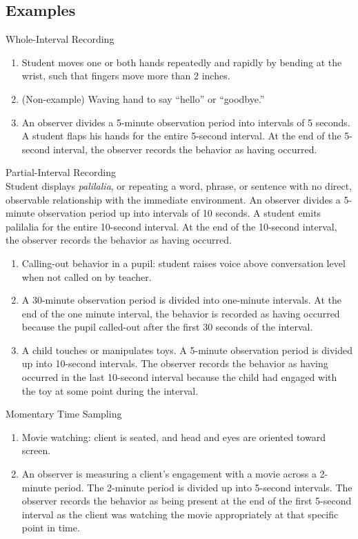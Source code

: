 \subsection{Examples}
Whole-Interval Recording
\begin{enumerate}
\item Student moves one or both hands repeatedly and rapidly by bending at the wrist, such that fingers move more than 2 inches. 
\item (Non-example) Waving hand to say ``hello'' or ``goodbye.''
\item An observer divides a 5-minute observation period into intervals of 5 seconds. A student flaps his hands for the entire 5-second interval. At the end of the 5-second interval, the observer records the behavior as having occurred.
\end{enumerate}
%
Partial-Interval Recording\\
Student displays \textit{palilalia}, or repeating a word, phrase, or sentence with no direct, observable relationship with the immediate environment. An observer divides a 5-minute observation period up into intervals of 10 seconds. A student emits palilalia for the entire 10-second interval. At the end of the 10-second interval, the observer records the behavior as having occurred.
\begin{enumerate}
\item Calling-out behavior in a pupil: student raises voice above conversation level when not called on by teacher.
\item A 30-minute observation period is divided into one-minute intervals.  At the end of the one minute interval, the behavior is recorded as having occurred because the pupil called-out after the first 30 seconds of the interval.
\item A child touches or manipulates toys. A 5-minute observation period is divided up into 10-second intervals. The observer records the behavior as having occurred in the last 10-second interval because the child had engaged with the toy at some point during the interval. 
\end{enumerate}

Momentary Time Sampling\\
\begin{enumerate}
\item Movie watching: client is seated, and head and eyes are oriented toward screen.
\item An observer is measuring a client's engagement with a movie across a 2-minute period. The 2-minute period is divided up into 5-second intervals. The observer records the behavior as being present at the end of the first 5-second interval as the client was watching the movie appropriately at that specific point in time. 
\end{enumerate}
%
